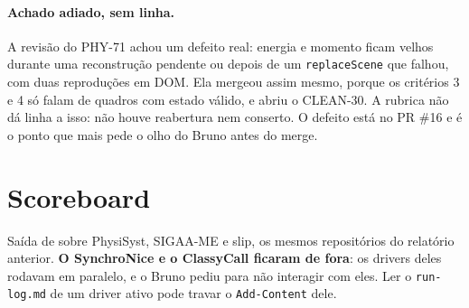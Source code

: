 \documentclass[11pt,a4paper]{article}
\begin{document}
\paragraph{Achado adiado, sem linha.} A revisão do PHY-71 achou um defeito
real: energia e momento ficam velhos durante uma reconstrução pendente ou
depois de um \texttt{replaceScene} que falhou, com duas reproduções em DOM.
Ela mergeou assim mesmo, porque os critérios 3 e 4 só falam de quadros com
estado válido, e abriu o CLEAN-30. A rubrica não dá linha a isso: não houve
reabertura nem conserto. O defeito está no PR \#16 e é o ponto que mais pede
o olho do Bruno antes do merge.

\section{Scoreboard}

Saída de  sobre PhysiSyst, SIGAA-ME e
slip, os mesmos repositórios do relatório anterior. \textbf{O SynchroNice e o
ClassyCall ficaram de fora}: os drivers deles rodavam em paralelo, e o Bruno
pediu para não interagir com eles. Ler o \texttt{run-log.md} de um driver
ativo pode travar o \texttt{Add-Content} dele.

\medskip
{}
\end{document}
